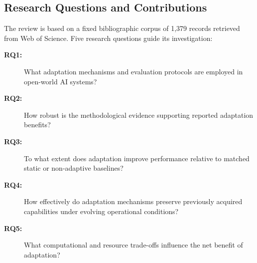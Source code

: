\subsection{Research Questions and Contributions}

The review is based on a fixed bibliographic corpus
of 1,379 records retrieved from Web of Science.
Five research questions guide its investigation:

\begin{description}
	\item[\textbf{RQ1:}]
	What adaptation mechanisms and evaluation protocols
	are employed in open-world AI systems?
	
	\item[\textbf{RQ2:}]
	How robust is the methodological evidence supporting
	reported adaptation benefits?
	
	\item[\textbf{RQ3:}]
	To what extent does adaptation improve performance
	relative to matched static or non-adaptive baselines?
	
	\item[\textbf{RQ4:}]
	How effectively do adaptation mechanisms preserve
	previously acquired capabilities under evolving
	operational conditions?
	
	\item[\textbf{RQ5:}]
	What computational and resource trade-offs influence
	the net benefit of adaptation?
\end{description}
